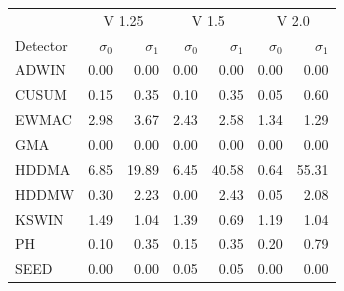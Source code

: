\begin{tabular}{lrrrrrr}
\hline
 & \multicolumn{2}{c}{V 1.25} & \multicolumn{2}{c}{V 1.5} & \multicolumn{2}{c}{V 2.0} \\
Detector & $\sigma_0$ & $\sigma_1$ & $\sigma_0$ & $\sigma_1$ & $\sigma_0$ & $\sigma_1$ \\ \hline
ADWIN & 0.00 & 0.00 & 0.00 & 0.00 & 0.00 & 0.00 \\
CUSUM & 0.15 & 0.35 & 0.10 & 0.35 & 0.05 & 0.60 \\
EWMAC & 2.98 & 3.67 & 2.43 & 2.58 & 1.34 & 1.29 \\
GMA & 0.00 & 0.00 & 0.00 & 0.00 & 0.00 & 0.00 \\
HDDMA & 6.85 & 19.89 & 6.45 & 40.58 & 0.64 & 55.31 \\
HDDMW & 0.30 & 2.23 & 0.00 & 2.43 & 0.05 & 2.08 \\
KSWIN & 1.49 & 1.04 & 1.39 & 0.69 & 1.19 & 1.04 \\
PH & 0.10 & 0.35 & 0.15 & 0.35 & 0.20 & 0.79 \\
SEED & 0.00 & 0.00 & 0.05 & 0.05 & 0.00 & 0.00 \\
\hline
\end{tabular}
